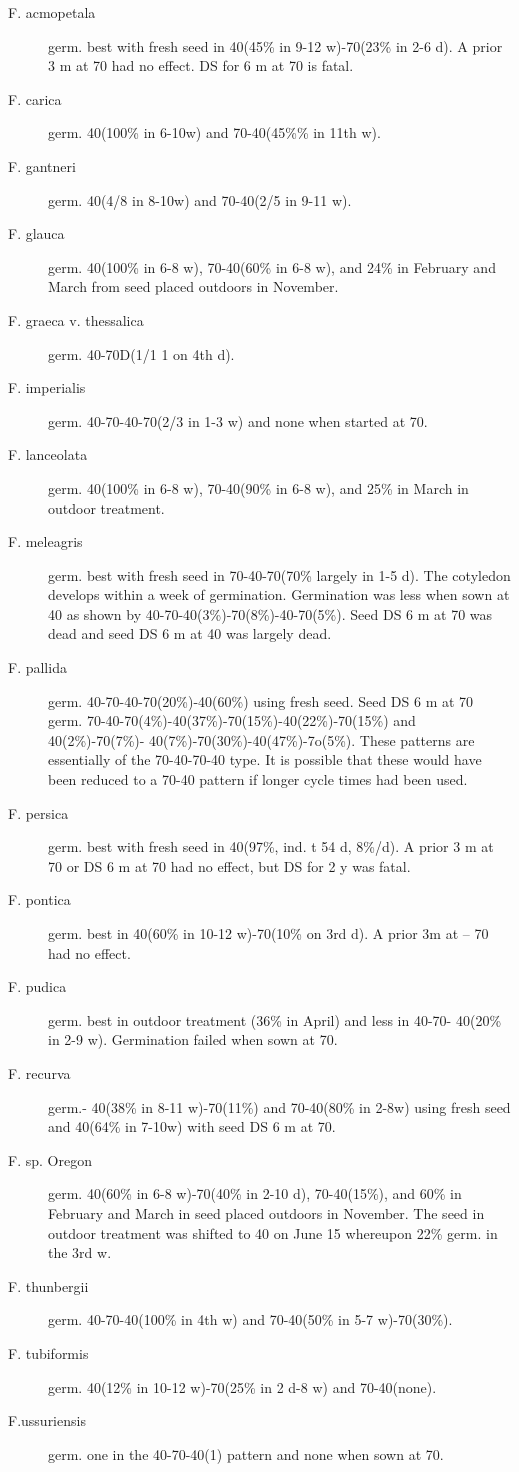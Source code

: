 \begin{description}
\item[F. acmopetala] germ. best with fresh seed in 40(45\% in 9-12 w)-70(23\% in 2-6
d). A prior 3 m at 70 had no effect. DS for 6 m at 70 is fatal.
\item[F. carica] germ. 40(100\% in 6-10w) and 70-40(45\%\% in 11th w).
\item[F. gantneri] germ. 40(4/8 in 8-10w) and 70-40(2/5 in 9-11 w).
\item[F. glauca] germ. 40(100\% in 6-8 w), 70-40(60\% in 6-8 w), and 24\% in February
and March from seed placed outdoors in November.
\item[F. graeca v. thessalica] germ. 40-70D(1/1 1 on 4th d).
\item[F. imperialis] germ. 40-70-40-70(2/3 in 1-3 w) and none when started at 70.
\item[F. lanceolata] germ. 40(100\% in 6-8 w), 70-40(90\% in 6-8 w), and 25\% in March
in outdoor treatment.
\item[F. meleagris] germ. best with fresh seed in 70-40-70(70\% largely in 1-5 d). The
cotyledon develops within a week of germination. Germination was less when sown at
40 as shown by 40-70-40(3\%)-70(8\%)-40-70(5\%). Seed DS 6 m at 70 was dead and
seed DS 6 m at 40 was largely dead.
\item[F. pallida] germ. 40-70-40-70(20\%)-40(60\%) using fresh seed. Seed DS 6 m at
70 germ. 70-40-70(4\%)-40(37\%)-70(15\%)-40(22\%)-70(15\%) and 40(2\%)-70(7\%)-
40(7\%)-70(30\%)-40(47\%)-7o(5\%). These patterns are essentially of the 70-40-70-40
type. It is possible that these would have been reduced to a 70-40 pattern if longer
cycle times had been used.
\item[F. persica] germ. best with fresh seed in 40(97\%, ind. t 54 d, 8\%/d). A prior 3 m
at 70 or DS 6 m at 70 had no effect, but DS for 2 y was fatal.

\item[F. pontica] germ. best in 40(60\% in 10-12 w)-70(10\% on 3rd d). A prior 3m at --
70 had no effect.
\item[F. pudica] germ. best in outdoor treatment (36\% in April) and less in 40-70-
40(20\% in 2-9 w). Germination failed when sown at 70.
\item[F. recurva] germ.- 40(38\% in 8-11 w)-70(11\%) and 70-40(80\% in 2-8w) using
fresh seed and 40(64\% in 7-10w) with seed DS 6 m at 70.
\item[F. sp. Oregon] germ. 40(60\% in 6-8 w)-70(40\% in 2-10 d), 70-40(15\%), and 60\%
in February and March in seed placed outdoors in November. The seed in outdoor
treatment was shifted to 40 on June 15 whereupon 22\% germ. in the 3rd w.
\item[F. thunbergii] germ. 40-70-40(100\% in 4th w) and 70-40(50\% in 5-7 w)-70(30\%).
\item[F. tubiformis] germ. 40(12\% in 10-12 w)-70(25\% in 2 d-8 w) and 70-40(none).
\item[F.ussuriensis] germ. one in the 40-70-40(1) pattern and none when sown at 70.


\end{description}
